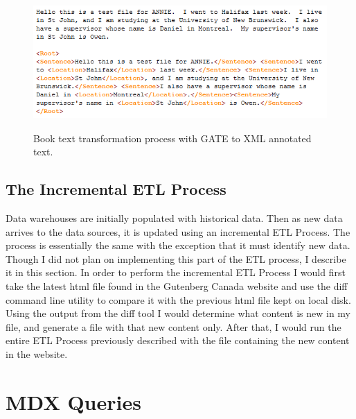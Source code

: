 \begin{figure}[htbp]
    \centering
        \includegraphics[height=2in]{figures/AnnotatedXML.png}
    \caption{Book text transformation process with GATE to XML annotated text.}
    \label{fig:figures_AnnotatedXML}
\end{figure}


\subsection{The Incremental ETL Process} %
\label{sub:the_incremental_etl_process}

Data warehouses are initially populated with historical data. Then as new data arrives to the data sources, it is updated using an incremental ETL Process. The
process is essentially the same with the exception that it must identify new data. Though I did not plan on implementing this part of the ETL process, I
describe it in this section. In order to perform the incremental ETL Process I would first take the latest html file found in the Gutenberg Canada website and
use the diff command line utility to compare it with the previous html file kept on local disk. Using the output from the diff tool I would determine what
content is new in my file, and generate a file with that new content only. After that, I would run the entire ETL Process previously described with the file
containing the new content in the website.


\section{MDX Queries} %
\label{sec:mdx_queries}

